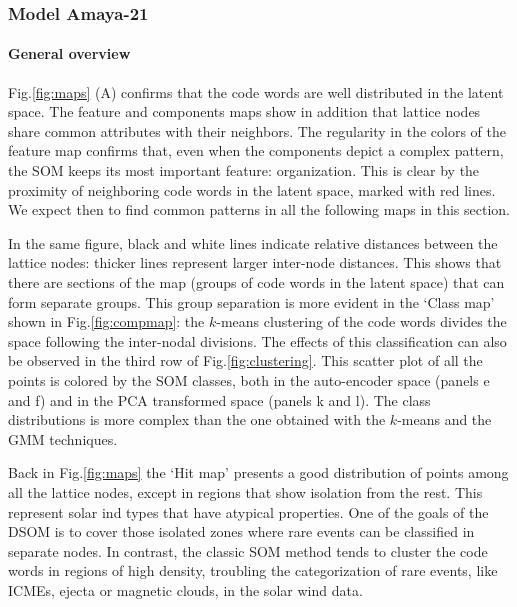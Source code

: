 \subsubsection{Model Amaya-21}

\paragraph{General overview}

Fig.\ref{fig:maps} (A) confirms that the code words are well distributed in the latent space. The feature and components maps show in addition that lattice nodes share common attributes with their neighbors. The regularity in the colors of the feature map confirms that, even when the components depict a complex pattern, the SOM keeps its most important feature: organization. This is clear by the proximity of neighboring code words in the latent space, marked with red lines. We expect then to find common patterns in all the following maps in this section.

In the same figure, black and white lines indicate relative distances between the lattice nodes: thicker lines represent larger inter-node distances. This shows that there are sections of the map (groups of code words in the latent space) that can form separate groups. This group separation is more evident in the `Class map' shown in Fig.\ref{fig:compmap}: the $k$-means clustering of the code words divides the space following the inter-nodal divisions. The effects of this classification can also be observed in the third row of Fig.\ref{fig:clustering}. This scatter plot of all the points is colored by the SOM classes, both in the auto-encoder space (panels e and f) and in the PCA transformed space (panels k and l). The class distributions is more complex than the one obtained with the $k$-means and the GMM techniques.

Back in Fig.\ref{fig:maps} the `Hit map' presents a good distribution of points among all the lattice nodes, except in regions that show isolation from the rest. This represent solar ind types that have atypical properties. One of the goals of the DSOM is to cover those isolated zones where rare events can be classified in separate nodes. In contrast, the classic SOM method tends to cluster the code words in regions of high density, troubling the categorization of rare events, like ICMEs, ejecta or magnetic clouds, in the solar wind data.

